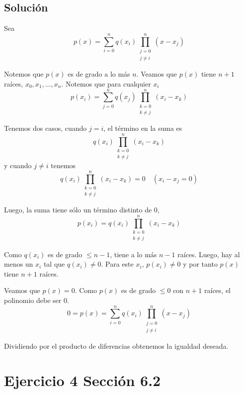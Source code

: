 \documentclass[12pt]{article}
\begin{document}
\subsection{Solución}

Sea
\begin{equation*}
    p(x) = \sum_{i=0}^n q(x_i) \prod_{\substack{j=0 \\ j\neq i}}^n (x - x_j)
\end{equation*}

Notemos que $p(x)$ es de grado a lo más $n$. Veamos que $p(x)$ tiene $n+1$ raíces, $x_0, x_1, \ldots, x_n$. Notemos que para cualquier $x_i$
\begin{equation*}
    p(x_i) = \sum_{j=0}^n q(x_j) \prod_{\substack{k=0 \\ k\neq j}}^n (x_i - x_k)
\end{equation*}

Tenemos dos casos, cuando $j = i$, el término en la suma es
\begin{equation*}
    q(x_i) \prod_{\substack{k=0 \\ k\neq j}}^n (x_i - x_k)
\end{equation*}
y cuando $j \neq i$ tenemos
\begin{equation*}
    q(x_i) \prod_{\substack{k=0 \\ k\neq j}}^n (x_i - x_k) = 0 \quad (x_i - x_j = 0)
\end{equation*}

Luego, la suma tiene sólo un término distinto de $0$,
\begin{equation*}
    p(x_i) = q(x_i) \prod_{\substack{k=0 \\ k\neq j}}^n (x_i - x_k)
\end{equation*}

Como $q(x_i)$ es de grado $\leq n-1$, tiene a lo más $n-1$ raíces. Luego, hay al menos un $x_i$ tal que $q(x_i) \neq 0$. Para este $x_i$, $p(x_i) \neq 0$ y por tanto $p(x)$ tiene $n+1$ raíces.

Veamos que $p(x) = 0$. Como $p(x)$ es de grado $\leq 0$ con $n+1$ raíces, el polinomio debe ser $0$.
\begin{equation*}
    0 = p(x) = \sum_{i=0}^n q(x_i) \prod_{\substack{j=0 \\ j\neq i}}^n (x - x_j)
\end{equation*}

Dividiendo por el producto de diferencias obtenemos la igualdad deseada.

\section{Ejercicio 4 Sección 6.2}
\end{document}
